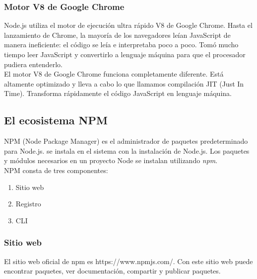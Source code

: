 \subsubsection{Motor V8 de Google Chrome}
Node.js utiliza el motor de ejecución ultra rápido V8 de Google Chrome. Hasta el lanzamiento de Chrome, la mayoría de los navegadores leían JavaScript de manera ineficiente: el código se leía e interpretaba poco a poco. Tomó mucho tiempo leer JavaScript y convertirlo a lenguaje máquina para que el procesador pudiera entenderlo. \\[0.8cm]
El motor V8 de Google Chrome funciona completamente diferente. Está altamente optimizado y lleva a cabo lo que llamamos compilación JIT (Just In Time). Transforma rápidamente el código JavaScript en lenguaje máquina.
  
\subsection{El ecosistema NPM}
NPM (Node Package Manager) es el administrador de paquetes predeterminado para Node.js. se instala en el sistema con la instalación de Node.js. Los paquetes y módulos necesarios en un proyecto Node se instalan utilizando \textit{npm}.\\[0.8cm]
NPM consta de tres componentes:
\begin{enumerate}
  \item Sitio web
  \item Registro
  \item CLI
\end{enumerate}
\subsubsection{Sitio web}
El sitio web oficial de npm es https://www.npmjs.com/. Con este sitio web puede encontrar paquetes, ver documentación, compartir y publicar paquetes.
